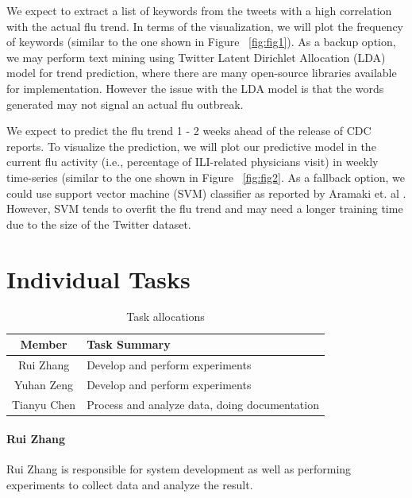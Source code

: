 \documentclass[12pt, oneside]{article}
\begin{document}
We expect to extract a list of keywords from the tweets with a high correlation with the actual flu trend. In terms of the visualization, we will plot the
frequency of keywords (similar to the one shown in Figure ~\ref{fig:fig1}). As a backup option, we may perform text mining using Twitter Latent Dirichlet
Allocation (LDA) model for trend prediction, where there are many open-source libraries available for implementation. However the issue with the LDA model is that
the words generated may not signal an actual flu outbreak.

We expect to predict the flu trend 1 - 2 weeks ahead of the release of CDC reports. To visualize the prediction, we will plot our predictive model in the
current flu activity (i.e., percentage of ILI-related physicians visit) in weekly time-series (similar to the one shown in Figure ~\ref{fig:fig2}.
As a fallback option, we could use support vector machine (SVM) classifier as reported by Aramaki et. al \cite{Aramaki}. However, SVM tends to
overfit the flu trend and may need a longer training time due to the size of the Twitter dataset.


\section{Individual Tasks}


\begin{table}[h]
  \centering
  \begin{tabularx}{0.8\textwidth}{ |c|X| }
    \hline
    \textbf{Member} & \textbf{Task Summary} \\
    \hline
    \hline
    Rui Zhang & Develop and perform experiments   \\
    \hline
    Yuhan Zeng & Develop and perform experiments  \\
    \hline
    Tianyu Chen & Process and analyze data, doing documentation  \\
    \hline
  \end{tabularx}
  \caption{Task allocations}
  \label{table:role}

\end{table}

\paragraph{Rui Zhang}
Rui Zhang is responsible for system development as well as performing experiments to collect data and analyze the result.
\end{document}
